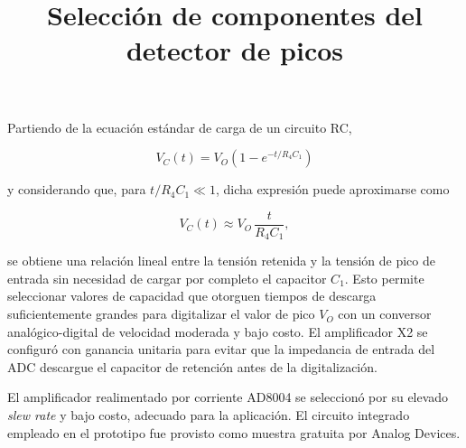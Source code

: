 Partiendo de la ecuación estándar de carga de un circuito RC,

\begin{equation}
  V_C(t) = V_O \left(1 - e^{-t/R_4 C_1}\right)
  \label{eq:carga_rc}
\end{equation}

\noindent y considerando que, para $t/R_4C_1 \ll 1$, dicha expresión
puede aproximarse como

\begin{equation}
  V_C(t) \approx V_O \, \frac{t}{R_4 C_1},
  \label{eq:carga_rc_lineal}
\end{equation}

\noindent se obtiene una relación lineal entre la tensión retenida y la tensión de pico de entrada sin necesidad de cargar por completo el capacitor $C_1$. Esto permite seleccionar valores de capacidad que otorguen tiempos de descarga suficientemente grandes para digitalizar el valor de pico $V_O$ con un conversor analógico-digital de velocidad moderada y bajo costo. El amplificador X2 se configuró con ganancia unitaria para evitar que la impedancia de entrada del ADC descargue el capacitor de retención antes de la digitalización.


\title{Selección de componentes del detector de picos}

El amplificador realimentado por corriente AD8004 se seleccionó por su elevado \emph{slew rate} y bajo costo, adecuado para la aplicación. El circuito integrado empleado en el prototipo fue provisto como muestra gratuita por Analog Devices. 

